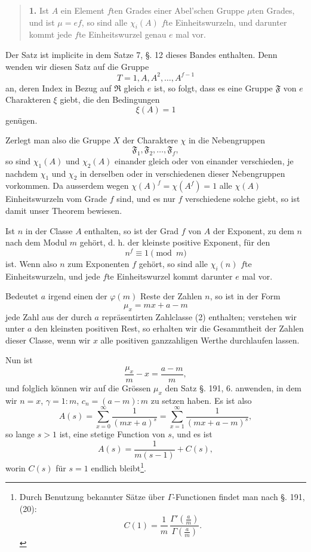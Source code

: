 \documentclass[11pt]{article}
\begin{document}
\begin{quote}
\textbf{1.} Ist $A$ ein Element $f$ten Grades einer Abel'schen Gruppe $\mu$ten Grades, und ist $\mu=ef$, so sind alle $\chi_i(A)$ $f$te Einheitswurzeln, und darunter kommt jede $f$te Einheitswurzel genau $e$ mal vor.
\end{quote}

Der Satz ist implicite in dem Satze 7, §. 12 dieses Bandes enthalten. Denn wenden wir diesen Satz auf die Gruppe
\[
T=1,A,A^2,\ldots,A^{f-1}
\]
an, deren Index in Bezug auf $\mathfrak R$ gleich $e$ ist, so folgt, dass es eine Gruppe $\mathfrak F$ von $e$ Charakteren $\xi$ giebt, die den Bedingungen
\[
\xi(A)=1
\]
genügen.

Zerlegt man also die Gruppe $X$ der Charaktere $\chi$ in die Nebengruppen
\[
\mathfrak F_1,\mathfrak F_2,\ldots,\mathfrak F_f,
\]
so sind $\chi_1(A)$ und $\chi_2(A)$ einander gleich oder von einander verschieden, je nachdem $\chi_1$ und $\chi_2$ in derselben oder in verschiedenen dieser Nebengruppen vorkommen. Da ausserdem wegen $\chi(A)^f=\chi(A^f)=1$ alle $\chi(A)$ Einheitswurzeln vom Grade $f$ sind, und es nur $f$ verschiedene solche giebt, so ist damit unser Theorem bewiesen.

Ist $n$ in der Classe $A$ enthalten, so ist der Grad $f$ von $A$ der Exponent, zu dem $n$ nach dem Modul $m$ gehört, d. h. der kleinste positive Exponent, für den
\begin{equation}\tag{5}
n^f\equiv1 \pmod m
\end{equation}
ist. Wenn also $n$ zum Exponenten $f$ gehört, so sind alle $\chi_i(n)$ $f$te Einheitswurzeln, und jede $f$te Einheitswurzel kommt darunter $e$ mal vor.

Bedeutet $a$ irgend einen der $\varphi(m)$ Reste der Zahlen $n$, so ist in der Form
\begin{equation}\tag{6}
\mu_x=mx+a-m
\end{equation}
jede Zahl aus der durch $a$ repräsentirten Zahlclasse (2) enthalten; verstehen wir unter $a$ den kleinsten positiven Rest, so erhalten wir die Gesammtheit der Zahlen dieser Classe, wenn wir $x$ alle positiven ganzzahligen Werthe durchlaufen lassen.

Nun ist
\[
\frac{\mu_x}{m}-x=\frac{a-m}{m},
\]
und folglich können wir auf die Grössen $\mu_x$ den Satz §. 191, 6. anwenden, in dem wir $n=x$, $\gamma=1:m$, $c_n=(a-m):m$ zu setzen haben. Es ist also
\begin{equation}\tag{7}
A(s)=\sum_{x=0}^{\infty}\frac{1}{(mx+a)^s}
     =\sum_{x=1}^{\infty}\frac{1}{(mx+a-m)^s},
\end{equation}
so lange $s>1$ ist, eine stetige Function von $s$, und es ist
\begin{equation}\tag{8}
A(s)=\frac{1}{m(s-1)}+C(s),
\end{equation}
worin $C(s)$ für $s=1$ endlich bleibt\footnote{Durch Benutzung bekannter Sätze über $\Gamma$-Functionen findet man nach §. 191, (20):
\[
C(1)=\frac1m\,\frac{\Gamma'\!\left(\frac am\right)}{\Gamma\!\left(\frac am\right)}.
\]
}.
\end{document}
